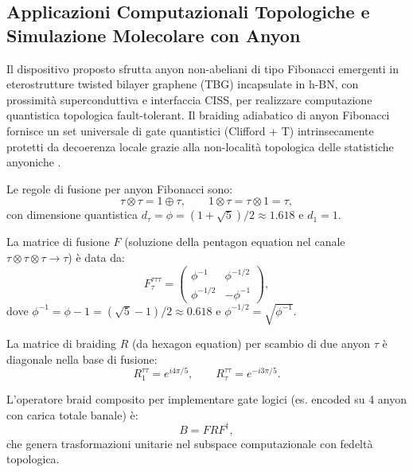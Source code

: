 \documentclass[11pt,a4paper]{article}
\let\oldcite\cite
\renewcommand{\cite}{\protect\oldcite}
\theoremstyle{plain}
\theoremstyle{definition}
\begin{document}
\subsection{Applicazioni Computazionali Topologiche e Simulazione Molecolare con Anyon}

Il dispositivo proposto sfrutta anyon non-abeliani di tipo Fibonacci emergenti in eterostrutture twisted bilayer graphene (TBG) incapsulate in h-BN, con prossimità superconduttiva e interfaccia CISS, per realizzare computazione quantistica topologica fault-tolerant. Il braiding adiabatico di anyon Fibonacci fornisce un set universale di gate quantistici (Clifford + T) intrinsecamente protetti da decoerenza locale grazie alla non-località topologica delle statistiche anyoniche \cite{freedman2002modular, kitaev2003fault, nayak2008non, xu2024non}.

Le regole di fusione per anyon Fibonacci sono:
\begin{equation}
\tau \otimes \tau = 1 \oplus \tau, \qquad 1 \otimes \tau = \tau \otimes 1 = \tau,
\label{eq:fusion_rules_fibonacci}
\end{equation}
con dimensione quantistica $d_\tau = \phi = (1 + \sqrt{5})/2 \approx 1.618$ e $d_1 = 1$.

La matrice di fusione $F$ (soluzione della pentagon equation nel canale $\tau \otimes \tau \otimes \tau \to \tau$) è data da:
\begin{equation}
F^{\tau \tau \tau}_{\tau} = \begin{pmatrix}
\phi^{-1} & \phi^{-1/2} \\
\phi^{-1/2} & -\phi^{-1}
\end{pmatrix},
\label{eq:F_fibonacci}
\end{equation}
dove $\phi^{-1} = \phi - 1 = (\sqrt{5}-1)/2 \approx 0.618$ e $\phi^{-1/2} = \sqrt{\phi^{-1}}$.

La matrice di braiding $R$ (da hexagon equation) per scambio di due anyon $\tau$ è diagonale nella base di fusione:
\begin{equation}
R^{\tau \tau}_{1} = e^{i 4\pi / 5}, \qquad R^{\tau \tau}_{\tau} = e^{-i 3\pi / 5}.
\label{eq:R_fibonacci}
\end{equation}

L'operatore braid composito per implementare gate logici (es. encoded su 4 anyon con carica totale banale) è:
\begin{equation}
B = F R F^\dagger,
\label{eq:braid_composite}
\end{equation}
che genera trasformazioni unitarie nel subspace computazionale con fedeltà topologica.
\end{document}
